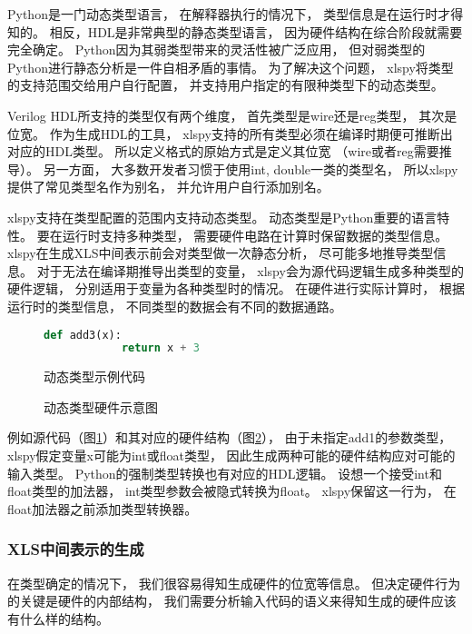 Python是一门动态类型语言，
在解释器执行的情况下，
类型信息是在运行时才得知的。
相反，HDL是非常典型的静态类型语言，
因为硬件结构在综合阶段就需要完全确定。
Python因为其弱类型带来的灵活性被广泛应用，
但对弱类型的Python进行静态分析是一件自相矛盾的事情。
为了解决这个问题，
xlspy将类型的支持范围交给用户自行配置，
并支持用户指定的有限种类型下的动态类型。

Verilog HDL所支持的类型仅有两个维度，
首先类型是wire还是reg类型，
其次是位宽。
作为生成HDL的工具，
xlspy支持的所有类型必须在编译时期便可推断出对应的HDL类型。
所以定义格式的原始方式是定义其位宽
（wire或者reg需要推导）。
另一方面，
大多数开发者习惯于使用int, double一类的类型名，
所以xlspy提供了常见类型名作为别名，
并允许用户自行添加别名。

xlspy支持在类型配置的范围内支持动态类型。
动态类型是Python重要的语言特性。
要在运行时支持多种类型，
需要硬件电路在计算时保留数据的类型信息。
xlspy在生成XLS中间表示前会对类型做一次静态分析，
尽可能多地推导类型信息。
对于无法在编译期推导出类型的变量，
xlspy会为源代码逻辑生成多种类型的硬件逻辑，
分别适用于变量为各种类型时的情况。
在硬件进行实际计算时，
根据运行时的类型信息，
不同类型的数据会有不同的数据通路。

\begin{figure}[h]
    \begin{lstlisting}[language=Python,frame=single]
        def add3(x):
            return x + 3
    \end{lstlisting}
    \caption{动态类型示例代码}
    \label{code.2}
\end{figure}

\begin{figure}[h]
\centering

\caption{动态类型硬件示意图}
\label{fig.2}
\end{figure}

例如源代码（图\ref{code.2}）和其对应的硬件结构（图\ref{fig.2}），
由于未指定add1的参数类型，
xlspy假定变量x可能为int或float类型，
因此生成两种可能的硬件结构应对可能的输入类型。
Python的强制类型转换也有对应的HDL逻辑。
设想一个接受int和float类型的加法器，
int类型参数会被隐式转换为float。
xlspy保留这一行为，
在float加法器之前添加类型转换器。

\subsubsection{XLS中间表示的生成}

在类型确定的情况下，
我们很容易得知生成硬件的位宽等信息。
但决定硬件行为的关键是硬件的内部结构，
我们需要分析输入代码的语义来得知生成的硬件应该有什么样的结构。

